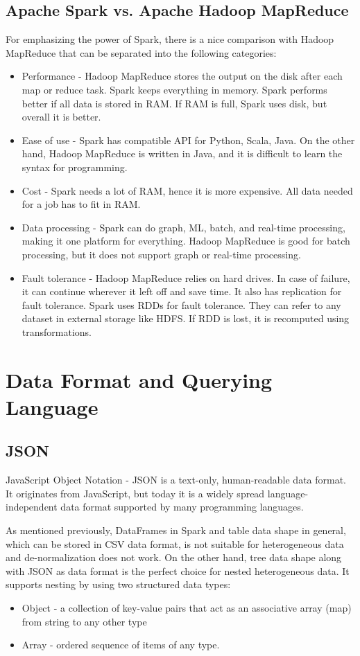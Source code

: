 \subsection{Apache Spark vs. Apache Hadoop MapReduce}
For emphasizing the power of Spark, there is a nice comparison with Hadoop MapReduce that can be separated into the following categories: 
\begin{itemize}
	\item Performance - Hadoop MapReduce stores the output on the disk after each map or reduce task. Spark keeps everything in memory. Spark performs better if all data is stored in RAM. If RAM is full, Spark uses disk, but overall it is better.
	\item Ease of use - Spark has compatible API for Python, Scala, Java. On the other hand, Hadoop MapReduce is written in Java, and it is difficult to learn the syntax for programming. 
	\item Cost - Spark needs a lot of RAM, hence it is more expensive. All data needed for a job has to fit in RAM.
	\item Data processing - Spark can do graph, ML, batch, and real-time processing, making it one platform for everything. Hadoop MapReduce is good for batch processing, but it does not support graph or real-time processing. 
	\item Fault tolerance - Hadoop MapReduce relies on hard drives. In case of failure, it can continue wherever it left off and save time. It also has replication for fault tolerance. Spark uses RDDs for fault tolerance. They can refer to any dataset in external storage like HDFS. If RDD is lost, it is recomputed using transformations.
\end{itemize}

\section{Data Format and Querying Language}
\subsection{JSON}
\label{sec:JSON}
JavaScript Object Notation - JSON \cite{JSON} is a text-only, human-readable data format. It originates from JavaScript, but today it is a widely spread language-independent data format supported by many programming languages. 

As mentioned previously, DataFrames in Spark and table data shape in general, which can be stored in CSV data format, is not suitable for heterogeneous data and de-normalization does not work. On the other hand, tree data shape along with JSON as data format is the perfect choice for nested heterogeneous data. It supports nesting by using two structured data types:
\begin{itemize}
	\item Object - a collection of key-value pairs that act as an associative array (map) from string to any other type 
	\item Array - ordered sequence of items of any type. 
\end{itemize} 

